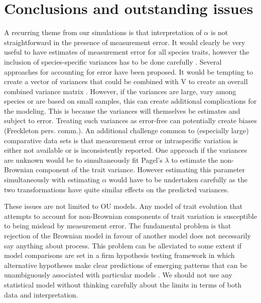 \documentclass[a4paper,12pt]{article}
\begin{document}
\section{Conclusions and outstanding issues}
  A recurring theme from our simulations is that interpretation of $\alpha$ is not straightforward in the presence of measurement error. It would clearly be very useful to have estimates of measurement error for all species traits, however the inclusion of species-specific variances has to be done carefully \citep[e.g.,][]{grafen1989phylogenetic}. Several approaches for accounting for error have been proposed. %
  It would be tempting to create a vector of variances that could be combined with V
  to create an overall combined variance matrix \citep{o2012evolutionary,Harmon:2010aa}. However, if the variances are large, vary among species or are based on small samples, this can create additional complications for the modeling. 
  This is because the variances will themselves be estimates and subject to error. Treating such variances as error-free can potentially create biases (Freckleton pers. comm.). 
  An additional challenge common to (especially large) comparative data sets is that measurement error or intraspecific variation is either not available or is inconsistently reported. 
  One approach if the variances are unknown would be to simultaneously fit Pagel's $\lambda$ \citep{Pagel:1997aa,Pagel:1999aa} to estimate the non-Brownian component of the trait variance. 
  However estimating this parameter simultaneously with estimating $\alpha$ would have to be undertaken carefully as the two transformations have quite similar effects on the predicted variances. 

  These issues are not limited to OU models. 
  Any model of trait evolution that attempts to account for non-Brownian components of trait variation is susceptible to being mislead by measurement error. 
  The fundamental problem is that rejection of the Brownian model in favour of another model does not necessarily say anything about process. 
  This problem can be alleviated to some extent if model comparisons are set in a firm hypothesis testing framework in which alternative hypotheses make clear predictions of emerging patterns that can be unambiguously associated with particular models \citep[e.g.,][]{Cooper:2011aa}. 
  We should not use any statistical model without thinking carefully about the limits in terms of both data and interpretation. 
\end{document}
